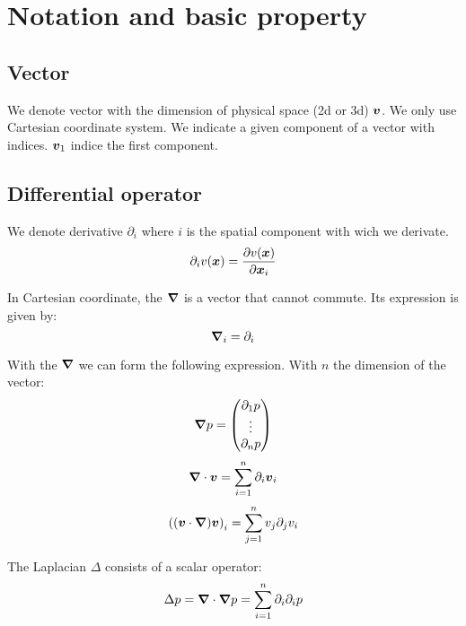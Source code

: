\chapter{Notation and basic property}
\minitoc


\section{Vector}

We denote vector with the dimension of physical space (2d or 3d) ${\boldsymbol {v}}$.
We only use Cartesian coordinate system.
We indicate a given component of a vector with indices. ${\boldsymbol {v}}_1$ indice the first component.

\section{Differential operator}

We denote derivative  $\partial_i$ where $i$ is the spatial component with wich we derivate.
\begin{equation}
 \partial_i v({\boldsymbol {x}})=\frac{\partial v({\boldsymbol {x}})}{\partial {\boldsymbol {x}}_{i}}
\end{equation}

\begin{definition}[Nabla]
 In Cartesian coordinate, the ${\boldsymbol {\nabla}}$ is a vector that cannot commute.
 Its expression is given by:
 \begin{equation}
 {\boldsymbol {\nabla}}_{i}=\partial_{i}
 \end{equation}
\end{definition}

With the ${\boldsymbol {\nabla}}$ we can form the following expression.
With $n$ the dimension of the vector:
\begin{equation}
 {\boldsymbol {\nabla}}p=\begin{pmatrix}\partial_1 p\\ \vdots \\ \partial_n p\end{pmatrix}
\end{equation}
\begin{equation}
 {\boldsymbol {\nabla}}\cdot {\boldsymbol {v}}=\sum_{i=1}^{n}\partial_i {\boldsymbol {v}}_i
\end{equation}
\begin{equation}
 \left(({\boldsymbol {v}}\cdot{\boldsymbol {\nabla}}){\boldsymbol {v}}\right)_{i}=\sum_{j=1}^{n}v_{j}\partial_{j} v_{i}
\end{equation}


\begin{definition}[Laplacian]
The Laplacian $\Delta$ consists of a scalar operator:
\begin{equation}
\Delta p={\boldsymbol {\nabla}}\cdot {\boldsymbol {\nabla}}p=\sum_{i=1}^{n} \partial_{i}\partial_{i}p
\end{equation}
\end{definition}

